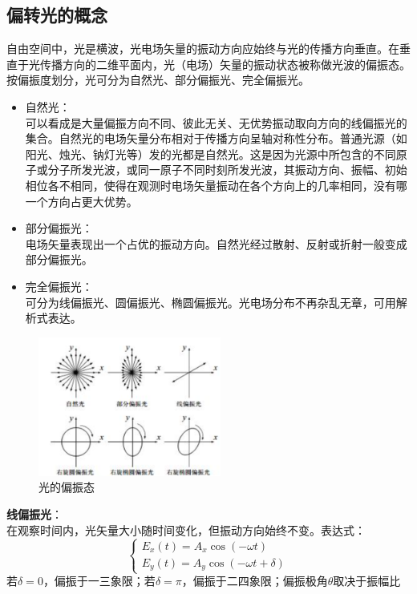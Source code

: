 \documentclass{article}
\begin{document}
\subsection{偏转光的概念}
\hspace*{2em}自由空间中，光是横波，光电场矢量的振动方向应始终与光的传播方向垂直。在垂直于光传播方向的二维平面内，光（电场）矢量的振动状态被称做光波的偏振态。按偏振度划分，光可分为自然光、部分偏振光、完全偏振光。
\begin{itemize}
    \item {自然光：\\可以看成是大量偏振方向不同、彼此无关、无优势振动取向方向的线偏振光的集合。自然光的电场矢量分布相对于传播方向呈轴对称性分布。普通光源（如阳光、烛光、钠灯光等）发的光都是自然光。这是因为光源中所包含的不同原子或分子所发光波，或同一原子不同时刻所发光波，其振动方向、振幅、初始相位各不相同，使得在观测时电场矢量振动在各个方向上的几率相同，没有哪一个方向占更大优势。}
    \item {部分偏振光：\\电场矢量表现出一个占优的振动方向。自然光经过散射、反射或折射一般变成部分偏振光。}
    \item {完全偏振光：\\
    可分为线偏振光、圆偏振光、椭圆偏振光。光电场分布不再杂乱无章，可用解析式表达。}
\end{itemize}
\begin{figure}[ht]
    \centering
    \includegraphics[width=6cm]{1.1.png}
    \caption{光的偏振态}
\end{figure}
\hspace*{2em}\textbf{线偏振光}：\\
\hspace*{2em}在观察时间内，光矢量大小随时间变化，但振动方向始终不变。表达式：
$$
\begin{cases}
E_x(t)=A_x\cos(-\omega t)\\
E_y(t)=A_y\cos(-\omega t + \delta)
\end{cases}
$$
\hspace*{2em}若\(\delta = 0\)，偏振于一三象限；若\(\delta = \pi\)，偏振于二四象限；偏振极角\(\theta\)取决于振幅比
\end{document}
